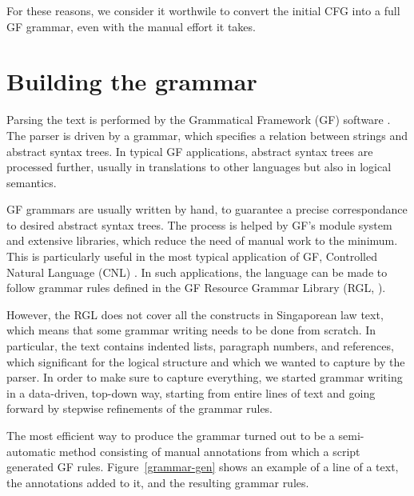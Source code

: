 \documentclass{IOS-Book-Article}
\begin{document}
For these reasons, we consider it worthwile to convert the initial CFG into a full GF grammar, even with the manual effort it takes.


\section{Building the grammar}

Parsing the text is performed by the Grammatical Framework (GF) software \cite{ranta-2011}.
The parser is driven by a grammar, which specifies a relation between strings and abstract syntax trees.
In typical GF applications, abstract syntax trees are processed further, usually in translations to other languages but also in logical semantics.

GF grammars are usually written by hand, to guarantee a precise correspondance to desired abstract syntax trees.
The process is helped by GF's module system and extensive libraries, which reduce the need of manual work to the minimum.
This is particularly useful in the most typical application of GF, Controlled Natural Language (CNL) \cite{fuchs-al-2008,angelov-ranta-2009}.
In such applications, the language can be made to follow grammar rules defined in the GF Resource Grammar Library (RGL, \cite{ranta-2009}).

However, the RGL does not cover all the constructs in Singaporean law text, which means that some grammar writing needs to be done from scratch.
In particular, the text contains indented lists, paragraph numbers, and references, which significant for the logical structure and which we wanted to capture by the parser.
In order to make sure to capture everything, we started grammar writing in a data-driven, top-down way, starting from entire lines of text and going forward by stepwise refinements of the grammar rules.

The most efficient way to produce the grammar turned out to be a semi-automatic method consisting of manual annotations from which a script generated GF rules.
Figure~\ref{grammar-gen} shows an example of a line of a text, the annotations added to it, and the resulting grammar rules.
\end{document}
